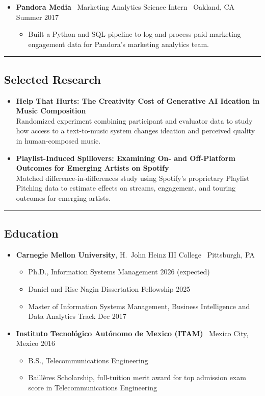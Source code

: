 \documentclass[10pt,letterpaper]{article}
\newcommand{\sep}{{\color{gray}\,\textbullet\,\,}}
\newcommand{\hsep}{\noindent\textcolor{gray}{\rule{\textwidth}{0.5pt}}}
\newcommand{\block}[1]{\begin{samepage}\hsep\subsection*{#1}\end{samepage}}
\begin{document}
\begin{itemize}[leftmargin=0pt, label={}]
\begin{itemize}
  \item Maintained KPI tracking, dashboards, and MAU reporting and forecasting workflows; used Hive and Airflow to support recurring targeting datasets and Tableau to monitor campaign performance.
  \end{itemize}
\item \textbf{Pandora Media} \sep Marketing Analytics Science Intern \sep Oakland, CA \hfill Summer 2017
  \begin{itemize}
  \item Built a Python and SQL pipeline to log and process paid marketing engagement data for Pandora's marketing analytics team.
  \end{itemize}
\end{itemize}

\block{Selected Research}

\begin{itemize}[leftmargin=0pt, label={}]
\item \textbf{Help That Hurts: The Creativity Cost of Generative AI Ideation in Music Composition} \\
Randomized experiment combining participant and evaluator data to study how access to a text-to-music system changes ideation and perceived quality in human-composed music.
\item \textbf{Playlist-Induced Spillovers: Examining On- and Off-Platform Outcomes for Emerging Artists on Spotify} \\
Matched difference-in-differences study using Spotify's proprietary Playlist Pitching data to estimate effects on streams, engagement, and touring outcomes for emerging artists.
\end{itemize}

\block{Education}

\begin{itemize}[leftmargin=0pt, label={}]
\item \textbf{Carnegie Mellon University}, H.\ John Heinz III College \sep Pittsburgh, PA
  \begin{itemize}[label={}]
  \item Ph.D., Information Systems Management \hfill 2026 (expected)
  \item Daniel and Rise Nagin Dissertation Fellowship \hfill 2025
  \item Master of Information Systems Management, Business Intelligence and Data Analytics Track \hfill Dec 2017
  \end{itemize}
\item \textbf{Instituto Tecnol\'ogico Aut\'onomo de Mexico (ITAM)} \sep Mexico City, Mexico \hfill 2016
  \begin{itemize}[label={}]
  \item B.S., Telecommunications Engineering
  \item Baill\`eres Scholarship, full-tuition merit award for top admission exam score in Telecommunications Engineering
  \end{itemize}
\end{itemize}
\end{document}

